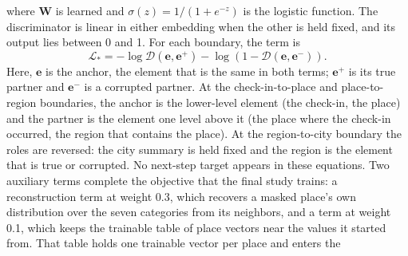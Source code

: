 where $\mathbf{W}$ is learned and
$\sigma(z)=1/(1+e^{-z})$ is the logistic function. The discriminator is linear in
either embedding when the other is held fixed, and its output lies between 0 and 1.
For each boundary, the term is
\begin{equation}\label{eq:fund:check2hgi-term}
    \mathcal{L}_{*} = -\log \mathcal{D}(\mathbf{e}, \mathbf{e}^{+})
    - \log\left(1 - \mathcal{D}(\mathbf{e}, \mathbf{e}^{-})\right).
\end{equation}
Here, $\mathbf{e}$ is the anchor, the element that is the same in both terms;
$\mathbf{e}^{+}$ is its true partner and $\mathbf{e}^{-}$ is a corrupted partner. At the check-in-to-place and
place-to-region boundaries, the anchor is the lower-level element (the check-in, the
place) and the partner is the element one level above it (the place where the check-in
occurred, the region that contains the place). At the region-to-city boundary the roles
are reversed: the city summary is held fixed and the region is the element that is true
or corrupted. No next-step target appears in these equations. Two auxiliary terms complete the
objective that the final study trains: a reconstruction term at weight 0.3, which
recovers a masked place's own distribution over the seven categories from its
neighbors, and a term at weight 0.1, which keeps the trainable table of place vectors
near the values it started from. That table holds one trainable vector per place and enters the
